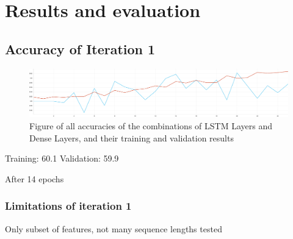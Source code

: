\chapter{Results and evaluation} \label{chap:results}
\section{Accuracy of Iteration 1}
\begin{figure}[h]
    \centering
    \includegraphics[width=\columnwidth]{figures/results/iteration1_3lstm64_2dense128_accuracy.pdf}
    \caption[Figure of accuracies of various layer variables for Iteration 1]{Figure of all accuracies of the combinations of LSTM Layers and Dense Layers, and their training and validation results}
    \label{fig:model}
\end{figure}

Training: 60.1%
Validation: 59.9%

After 14 epochs
\subsection{Limitations of iteration 1}
Only subset of features, not many sequence lengths tested